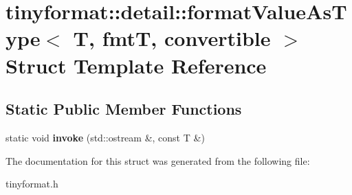 \hypertarget{structtinyformat_1_1detail_1_1formatValueAsType}{}\section{tinyformat\+:\+:detail\+:\+:format\+Value\+As\+Type$<$ T, fmtT, convertible $>$ Struct Template Reference}
\label{structtinyformat_1_1detail_1_1formatValueAsType}
\subsection*{Static Public Member Functions}
\begin{DoxyCompactItemize}
\item 
\mbox{\label{structtinyformat_1_1detail_1_1formatValueAsType_a126bc5958024c456851f08fa380d1cac}} 
static void {\bfseries invoke} (std\+::ostream \&, const T \&)
\end{DoxyCompactItemize}


The documentation for this struct was generated from the following file\+:\begin{DoxyCompactItemize}
\item 
tinyformat.\+h\end{DoxyCompactItemize}
